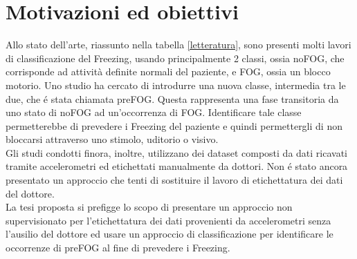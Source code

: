 


\chapter[Motivazioni ed obiettivi]{Motivazioni ed obiettivi}\label{chap4:Goals}
Allo stato dell'arte, riassunto nella tabella \ref{letteratura}, sono presenti molti lavori di classificazione del Freezing, usando principalmente 2 classi, ossia noFOG, che corrisponde ad attività definite normali del paziente, e FOG, ossia un blocco motorio. Uno studio ha cercato di introdurre una nuova classe, intermedia tra le due, che é stata chiamata preFOG. Questa rappresenta una fase transitoria da uno stato di noFOG ad un'occorrenza di FOG. Identificare tale classe permetterebbe di prevedere i Freezing del paziente e quindi permettergli di non bloccarsi attraverso uno stimolo, uditorio o visivo.\\
Gli studi condotti finora, inoltre, utilizzano dei dataset composti da dati ricavati tramite accelerometri ed etichettati manualmente da dottori. Non é stato ancora presentato un approccio che tenti di sostituire il lavoro di etichettatura dei dati del dottore.\\
La tesi proposta si prefigge lo scopo di presentare un approccio non supervisionato per l'etichettatura dei dati provenienti da accelerometri senza l'ausilio del dottore ed usare un approccio di classificazione per identificare le occorrenze di preFOG al fine di prevedere i Freezing.\\
%
